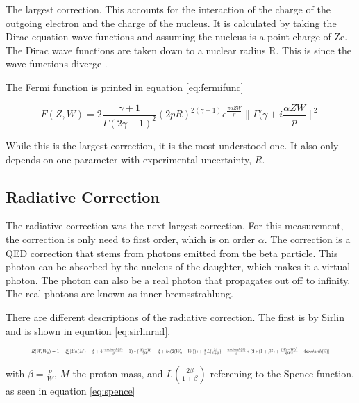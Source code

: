 The largest correction. 
This accounts for the interaction of the charge of the outgoing electron and the charge of the nucleus.
It is calculated by taking the Dirac equation wave functions and assuming the nucleus is a point charge of Ze.
The Dirac wave functions are taken down to a nuclear radius R.
This is since the wave functions diverge \cite{Wil89}.

The Fermi function is printed in equation \ref{eq:fermifunc}

\begin{equation}
	F(Z,W) = 2\frac{\gamma + 1}{\Gamma(2\gamma +1)^{2}}(2pR)^{2(\gamma - 1)}e^{\frac{\pi\alpha ZW}{p}}\|\Gamma(\gamma + i\frac{\alpha ZW}{p}\|^{2}
	\label{eq:fermifunc}
\end{equation}

While this is the largest correction, it is the most understood one.
It also only depends on one parameter with experimental uncertainty, $R$. 


\subsection{Radiative Correction}
The radiative correction was the next largest correction.
For this measurement, the correction is only need to first order, which is on order $\alpha$.
The correction is a QED correction that stems from photons emitted from the beta particle.
This photon can be absorbed by the nucleus of the daughter, which makes it a virtual photon.
The photon can also be a real photon that propagates out off to infinity.
The real photons are known as inner bremsstrahlung.

There are different descriptions of the radiative correction.  
The first is by Sirlin \cite{Sir67} and is shown in equation \ref{eq:sirlinrad}.

\begin{equation}
	\resizebox{.9\textwidth}{!}
	{
	$R(W,W_{0}) = 1 + \frac{\alpha}{2\pi}[3ln(M) - \frac{3}{4} + 4(\frac{arctanh(\beta)}{\beta} - 1)*(\frac{W_{0} - W}{3W} - \frac{3}{2} + ln(2(W_{0} - W))) + \frac{4}{\beta}L(\frac{2\beta}{1 + \beta}) + \frac{arctanh(\beta)}{\beta}*(2*(1 + \beta^{2}) + \frac{(W_{0} - W)^{2}}{6W^{2}} - 4 arctanh(\beta)]$
	}
	\label{eq:sirlinrad}
\end{equation} 

with $\beta = \frac{p}{W}$, $M$ the proton mass, and $L(\frac{2\beta}{1+\beta})$ referening to the Spence function, as seen in equation \ref{eq:spence} \cite{Wil95}


